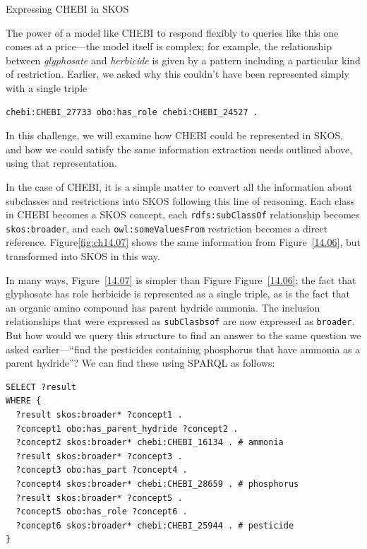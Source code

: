 \begin{challenge}{Expressing CHEBI in SKOS}
\label{chal:39}

The power of a model like CHEBI to respond flexibly to queries like this
one comes at a price---the model itself is complex; for example, the
relationship between \textit{glyphosate} and \textit{herbicide} is given by a pattern
including a particular kind of restriction. Earlier, we asked why this
couldn't have been represented simply with a single triple

\begin{lstlisting}
chebi:CHEBI_27733 obo:has_role chebi:CHEBI_24527 .
\end{lstlisting}

In this challenge, we will examine how CHEBI could be represented in
SKOS, and how we could satisfy the same information extraction needs
outlined above, using that representation.

In the case of CHEBI, it is a simple matter to convert all the
information about subclasses and restrictions into SKOS following this
line of reasoning. Each class in CHEBI becomes a SKOS concept, each
\texttt{rdfs:subClassOf} relationship becomes \texttt{skos:broader}, and each
\texttt{owl:someValuesFrom} restriction becomes a direct reference. Figure\ref{fig:ch14.07}
shows the same information from Figure~\ref{14.06}, but transformed into SKOS
in this way.

In many ways, Figure~\ref{14.07} is simpler than Figure Figure~\ref{14.06}; the fact that
glyphosate has role herbicide is represented as a single triple, as is
the fact that an organic amino compound has parent hydride ammonia. The
inclusion relationships that were expressed as \texttt{subClasbsof} are now
expressed as \texttt{broader}. But how would we query this structure to find an
answer to the same question we asked earlier---``find the pesticides
containing phosphorus that have ammonia as a parent hydride''? We can
find these using SPARQL as follows:

\begin{lstlisting}
SELECT ?result
WHERE {
  ?result skos:broader* ?concept1 .
  ?concept1 obo:has_parent_hydride ?concept2 .
  ?concept2 skos:broader* chebi:CHEBI_16134 . # ammonia
  ?result skos:broader* ?concept3 .
  ?concept3 obo:has_part ?concept4 .
  ?concept4 skos:broader* chebi:CHEBI_28659 . # phosphorus
  ?result skos:broader* ?concept5 .
  ?concept5 obo:has_role ?concept6 .
  ?concept6 skos:broader* chebi:CHEBI_25944 . # pesticide
}
\end{lstlisting}


\end{challenge}
